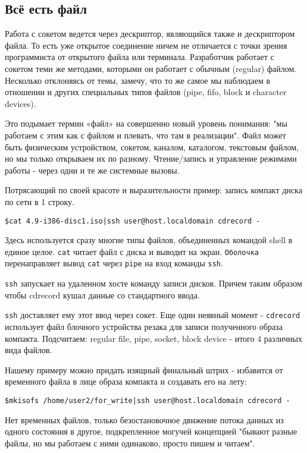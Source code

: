 \subsection{Всё есть файл}

Работа с сокетом ведется через дескриптор, являющийся также и дескриптором файла. То есть уже открытое соединение ничем не отличается с точки зрения программиста от открытого файла или терминала. Разработчик работает с сокетом теми же методами, которыми он работает с обычным (regular) файлом. Несколько отклоняясь от темы, замечу, что то же самое мы наблюдаем в отношении и других специальных типов файлов (pipe, fifo, block и character devices).

Это подымает термин «файл» на совершенно новый уровень понимания: "мы работаем с этим как с файлом и плевать, что там в реализации". Файл может быть физическим устройством, сокетом, каналом, каталогом, текстовым файлом, но мы только открываем их по разному. Чтение/запись и управление режимами работы - через одни и те же системные вызовы.

Потрясающий по своей красоте и выразительности пример: запись компакт диска по сети в 1 строку.
\begin{verbatim}
$cat 4.9-i386-disc1.iso|ssh user@host.localdomain cdrecord -
\end{verbatim}
Здесь используется сразу многие типы файлов, объединенных командой shell в единое целое.
\verb+cat+ читает файл с диска и выводит на экран. \verb+Оболочка+ перенаправляет вывод \verb+cat+ через \verb+pipe+ на вход команды \verb+ssh+.

\verb+ssh+ запускает на удаленном хосте команду записи дисков. Причем таким образом чтобы cdrecord кушал данные со стандартного ввода.

\verb+ssh+ доставляет ему этот ввод через сокет. Еще один неявный момент - \verb+cdrecord+ использует файл блочного устройства резака для записи полученного образа компакта. Подсчитаем: regular file, pipe, socket, block device - итого 4 различных вида файлов.

Нашему примеру можно придать изящный финальный штрих - избавится от временного файла в лице образа компакта и создавать его на лету:
\begin{verbatim}
$mkisofs /home/user2/for_write|ssh user@host.localdomain cdrecord -
\end{verbatim}

Нет временных файлов, только безостановочное движение потока данных из одного состояния в другое, подкрепленное могучей концепцией "бывают разные файлы, но мы работаем с ними одинаково, просто пишем и читаем".

